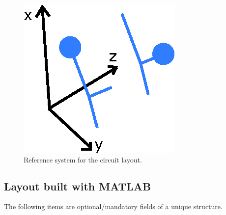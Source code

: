 \documentclass[a4paper,10pt]{article}
\begin{document}
\begin{figure}[h!]
	\centering
	\includegraphics[scale=0.8]{axis.eps}
	\caption{Reference system for the circuit layout.}
	\label{fig:ref_sys}
\end{figure}

\subsection{Layout built with MATLAB}\label{subsec:matlab_layout}
\noindent The following items are optional/mandatory fields of a unique structure.
\end{document}
